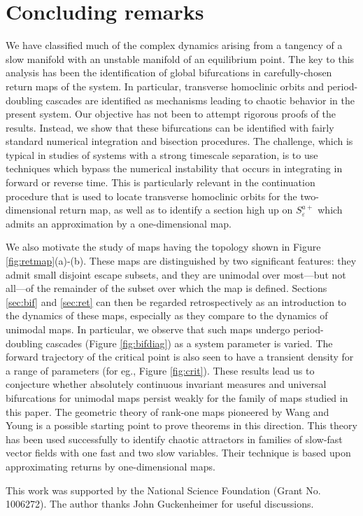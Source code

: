 \documentclass[aip, cha, sd, amsmath,amssymb, preprint]{revtex4-1}
\begin{document}
\section{Concluding remarks}

We have classified much of the complex dynamics arising from a tangency of a slow manifold with an unstable manifold of an equilibrium point. The key to this analysis has been the identification of global bifurcations in carefully-chosen return maps of the system. In particular, transverse homoclinic orbits and period-doubling cascades are identified as mechanisms leading to chaotic behavior in the present system. Our objective has not been to attempt rigorous proofs of the results. Instead, we show that these bifurcations can be identified with fairly standard numerical integration and bisection procedures. The challenge, which is typical in studies of systems with a strong timescale separation, is to use techniques which bypass the numerical instability that occurs in integrating in forward or reverse time.  This is particularly relevant in the continuation procedure that is used to locate transverse homoclinic orbits for the two-dimensional return map, as well as to identify a section high up on $S^{a+}_{ \varepsilon}$ which admits an approximation by a one-dimensional map. 

We also motivate the study of maps having the topology shown in Figure \ref{fig:retmap}(a)-(b). These maps are distinguished by two significant features: they admit small disjoint escape subsets, and they are unimodal over most---but not all---of the remainder of the subset over which the map is defined. Sections \ref{sec:bif} and \ref{sec:ret} can then be regarded retrospectively as an introduction to the dynamics of these maps, especially as they compare to the dynamics of unimodal maps. In particular, we observe that such maps undergo period-doubling cascades (Figure \ref{fig:bifdiag}) as a system parameter is varied. The forward trajectory of the critical point is also seen to have a transient density for a range of parameters (for eg., Figure \ref{fig:crit}). These results lead us to conjecture whether absolutely continuous invariant measures and universal bifurcations for unimodal maps persist weakly for the family of maps studied in this paper. The geometric theory of rank-one maps pioneered by Wang and Young\cite{wang2008} is a possible starting point to prove theorems in this direction. This theory has been used successfully to identify chaotic attractors in families of slow-fast vector fields with one fast and two slow variables.\cite{guckenheimer2006} Their technique is based upon approximating returns by one-dimensional maps. 

\begin{acknowledgments}
This work was supported by the National Science Foundation (Grant No. 1006272). The author thanks John Guckenheimer for useful discussions.
\end{acknowledgments}


\end{document}
